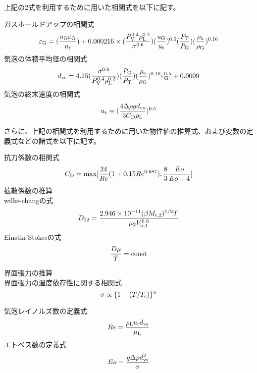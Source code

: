 \documentclass[a4j]{jsarticle}
\begin{document}
上記の2式を利用するために用いた相関式を以下に記す。

ガスホールドアップの相関式
\begin{equation}
    \varepsilon_{{\rm G}} = (\frac{u_{{\rm G}}\varepsilon_{{\rm G}}}{u_{{\rm t}}}) + 0.000216 \times(\frac{P_{{\rm V}}^{0.4} \rho_{{\rm L}}^{0.2} }{ \sigma^{0.6}})(\frac{u_{{\rm G}}}{u_{{\rm t}}})^{0.5}(\frac{P_{{\rm T}}}{P_{{\rm G}}})(\frac{\rho_{{\rm a}}}{\rho_{{\rm G}}})^{0.16}
\end{equation}
気泡の体積平均径の相関式
\begin{equation}
    d_{{\rm vs}} = 4.15 (\frac{\sigma^{0.6}}{P_{{\rm V}}^{0.4} \rho_{{\rm L}}^{0.2}})(\frac{P_{{\rm G}}}{P_{{\rm T}}})(\frac{\rho_{{\rm a}}}{\rho_{{\rm G}}})^{0.16} \varepsilon_{{\rm G}}^{0.5} + 0.0009
\end{equation}
気泡の終末速度の相関式
\begin{equation}
    u_{{\rm t}} = (\frac{4\Delta \rho g d_{{\rm vs}}}{3C_{{\rm D}}\rho_{{\rm L}}})^{0.5}
\end{equation}

さらに、上記の相関式を利用するために用いた物性値の推算式、および変数の定義式などの諸式を以下に記す。

抗力係数の相関式
\begin{equation}
    C_{{\rm D}} = {\rm max}[\frac{24}{Re}(1+0.15Re^{0.687}), \frac{8}{3}\frac{Eo}{Eo+4}]
\end{equation}
拡散係数の推算\\
wilke-changの式
\begin{equation}
    D_{12} = \frac{2.946\times 10^{-11}(\beta M_{{\rm r,2}})^{1/2} T} {\mu_2 V_{{\rm b,1}}^{0.6}}
\end{equation}
Einstin-Stokesの式
\begin{equation}
    \frac{D \mu}{T} = {\rm const}
\end{equation}

界面張力の推算\\
界面張力の温度依存性に関する相関式
\begin{equation}
    \sigma \propto \{1-(T/T_{{\rm c}}) \}^n    
\end{equation}

気泡レイノルズ数の定義式
\begin{equation}
    Re = \frac{\rho_{{\rm L}}u_{{\rm t}}d_{{\rm vs}}}{\mu_{{\rm L}}}
\end{equation}
エトベス数の定義式
\begin{equation}
    Eo = \frac{g \Delta \rho d_{{\rm vs}}^2}{\sigma}
\end{equation}
\end{document}
